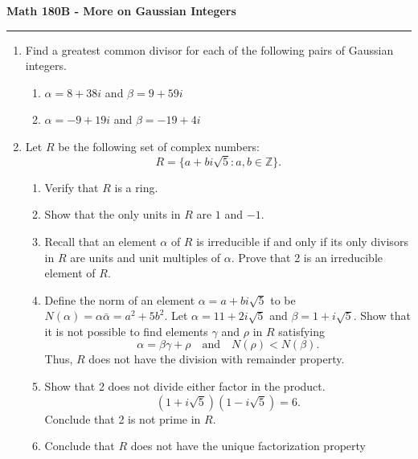\documentclass[11pt,letterpaper]{report}
\newcommand{\integers}{\mathbb{Z}}
\begin{document}
\begin{center}
{\bf \Large Math 180B - More on Gaussian Integers}
\vspace{0.2cm}
\hrule
\end{center}

\begin{enumerate}
	\item Find a greatest common divisor for each of the following pairs of Gaussian integers.
	\begin{enumerate}
		\item $\alpha = 8+38i$ and $\beta = 9+59i$
		\item $\alpha = -9+19i$ and $\beta= -19+4i$
	\end{enumerate}

	\vfill

	\item Let $R$ be the following set of complex numbers:
	\[
	R = \{a+bi\sqrt{5}: a,b\in \integers\}.
	\]
	\begin{enumerate}
		\item Verify that $R$ is a ring.
		\vfill
		\item Show that the only units in $R$ are $1$ and $-1$.
		\vfill
		\item Recall that an element $\alpha$ of $R$ is irreducible if and only if its only divisors in $R$ are units and unit multiples of $\alpha$. Prove that 2 is an irreducible element of $R$.
		\vfill
		\item Define the norm of an element $\alpha = a+bi\sqrt{5}$ to be $N(\alpha) = \alpha\bar{\alpha} = a^2+5b^2$. Let $\alpha = 11+2i\sqrt{5}$ and $\beta = 1+i\sqrt{5}$. Show that it is not possible to find elements $\gamma$ and $\rho$ in $R$ satisfying
		\[
		\alpha = \beta\gamma + \rho\quad\text{and}\quad N(\rho)<N(\beta).
		\]
		Thus, $R$ does not have the division with remainder property.

		\vfill

		\item Show that 2 does not divide either factor in the product.
		\[
		(1+i\sqrt{5})(1-i\sqrt{5}) = 6.
		\]
		Conclude that 2 is not prime in $R$.

		\vfill

		\item Conclude that $R$ does not have the unique factorization property
		\vfill
	\end{enumerate}
\end{enumerate}
\end{document}
